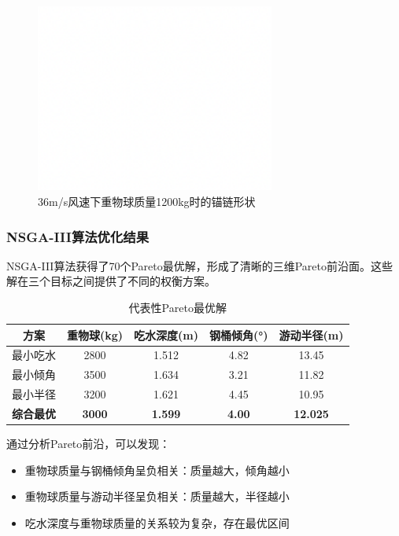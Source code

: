 \documentclass[withoutpreface,bwprint]{cumcmthesis}
\begin{document}
\begin{figure}[H]
\centering
\includegraphics[width=0.7\textwidth]{figures/测试图片.png}
\caption{36m/s风速下重物球质量1200kg时的锚链形状}
\label{fig:锚链形状1200kg}
\end{figure}

\subsubsection{NSGA-III算法优化结果}
NSGA-III算法获得了70个Pareto最优解，形成了清晰的三维Pareto前沿面。这些解在三个目标之间提供了不同的权衡方案。

\begin{table}[H]
\centering
\begin{tabular}{ccccc}
\toprule
方案 & 重物球(kg) & 吃水深度(m) & 钢桶倾角(°) & 游动半径(m) \\
\midrule
最小吃水 & 2800 & 1.512 & 4.82 & 13.45 \\
最小倾角 & 3500 & 1.634 & 3.21 & 11.82 \\
最小半径 & 3200 & 1.621 & 4.45 & 10.95 \\
\textbf{综合最优} & \textbf{3000} & \textbf{1.599} & \textbf{4.00} & \textbf{12.025} \\
\bottomrule
\end{tabular}
\caption{代表性Pareto最优解}
\label{tab:Pareto解}
\end{table}

通过分析Pareto前沿，可以发现：
\begin{itemize}
\item 重物球质量与钢桶倾角呈负相关：质量越大，倾角越小
\item 重物球质量与游动半径呈负相关：质量越大，半径越小
\item 吃水深度与重物球质量的关系较为复杂，存在最优区间
\end{itemize}
\end{document}
